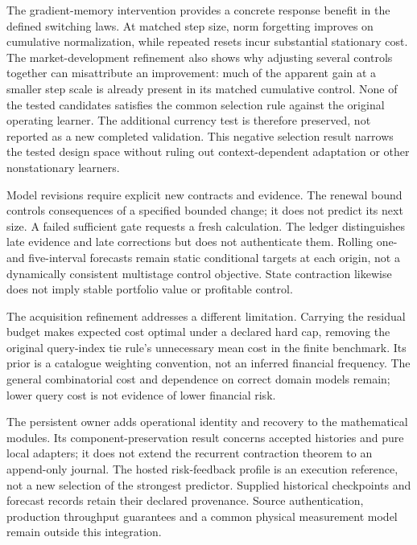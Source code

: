 \documentclass[11pt,a4paper]{article}
\theoremstyle{definition}\newtheorem{definition}[theorem]{Definition}
\begin{document}
The gradient-memory intervention provides a concrete response benefit in the defined switching laws. At matched step size, norm forgetting improves on cumulative normalization, while repeated resets incur substantial stationary cost. The market-development refinement also shows why adjusting several controls together can misattribute an improvement: much of the apparent gain at a smaller step scale is already present in its matched cumulative control. None of the tested candidates satisfies the common selection rule against the original operating learner. The additional currency test is therefore preserved, not reported as a new completed validation. This negative selection result narrows the tested design space without ruling out context-dependent adaptation or other nonstationary learners.

Model revisions require explicit new contracts and evidence. The renewal bound controls consequences of a specified bounded change; it does not predict its next size. A failed sufficient gate requests a fresh calculation. The ledger distinguishes late evidence and late corrections but does not authenticate them. Rolling one- and five-interval forecasts remain static conditional targets at each origin, not a dynamically consistent multistage control objective. State contraction likewise does not imply stable portfolio value or profitable control.

The acquisition refinement addresses a different limitation. Carrying the residual budget makes expected cost optimal under a declared hard cap, removing the original query-index tie rule's unnecessary mean cost in the finite benchmark. Its prior is a catalogue weighting convention, not an inferred financial frequency. The general combinatorial cost and dependence on correct domain models remain; lower query cost is not evidence of lower financial risk.

The persistent owner adds operational identity and recovery to the mathematical modules. Its component-preservation result concerns accepted histories and pure local adapters; it does not extend the recurrent contraction theorem to an append-only journal. The hosted risk-feedback profile is an execution reference, not a new selection of the strongest predictor. Supplied historical checkpoints and forecast records retain their declared provenance. Source authentication, production throughput guarantees and a common physical measurement model remain outside this integration.
\end{document}
